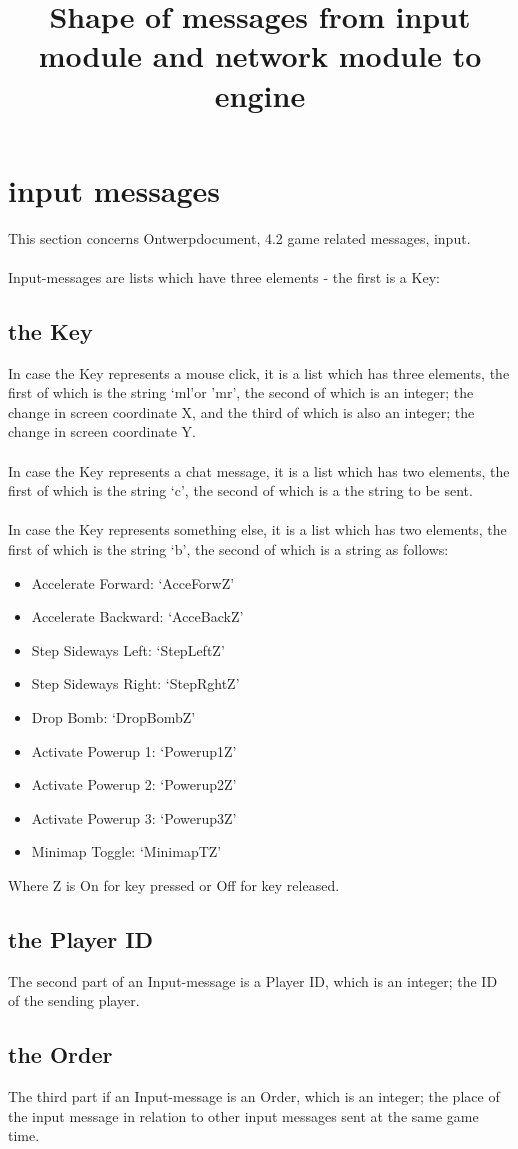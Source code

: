 \documentclass[]{article}
\title{Shape of messages from input module and network module to engine}
\begin{document}
\section{input messages}

This section concerns Ontwerpdocument, 4.2 game related messages, input.\\
\\
Input-messages are lists which have three elements - the first is a Key:

\subsection{the Key}

In case the Key represents a mouse click, it is a list which has three elements, the first of which is the string `ml'or 'mr', the second of which is an integer; the change in screen coordinate X, and the third of which is also an integer; the change in screen coordinate Y.\\
\\ 
In case the Key represents a chat message, it is a list which has two elements, the first of which is the string `c', the second of which is a the string to be sent.\\
\\
In case the Key represents something else, it is a list which has two elements, the first of which is the string `b', the second of which is a string as follows:

\begin{itemize}
    \item Accelerate Forward: `AcceForwZ'
    \item Accelerate Backward: `AcceBackZ'
    \item Step Sideways Left: `StepLeftZ'
    \item Step Sideways Right: `StepRghtZ'
    \item Drop Bomb: `DropBombZ'
    \item Activate Powerup 1: `Powerup1Z'
    \item Activate Powerup 2: `Powerup2Z'
    \item Activate Powerup 3: `Powerup3Z'
    \item Minimap Toggle: `MinimapTZ'
\end{itemize}


Where Z is On for key pressed or Off for key released.

\subsection{the Player ID}

The second part of an Input-message is a Player ID, which is an integer; the ID of the sending player.

\subsection{the Order}

The third part if an Input-message is an Order, which is an integer; the place of the input message in relation to other input messages sent at the same game time.
\end{document}
